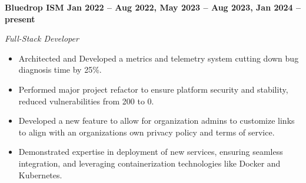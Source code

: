 \vspace{0.1cm}
\textbf{Bluedrop ISM \hfill Jan 2022 -- Aug 2022, May 2023 -- Aug 2023, Jan 2024 -- present} \par
\textit{Full-Stack Developer} \par
\begin{itemize}
	\item Architected and Developed a metrics and telemetry system cutting down bug diagnosis time by 25\%.
    \item Performed major project refactor to ensure platform security and stability, reduced vulnerabilities from 200 to 0.
    \item Developed a new feature to allow for organization admins to customize links to align with an organizations own privacy policy and terms of service.
    \item Demonstrated expertise in deployment of new services, ensuring seamless integration, and leveraging containerization technologies like Docker and Kubernetes.
\end{itemize} \par